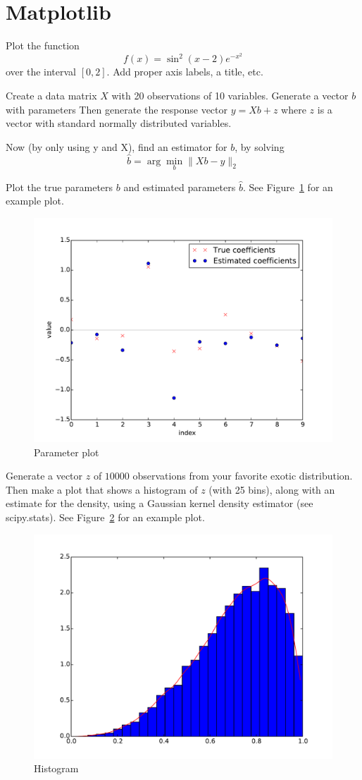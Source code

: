 \section{Matplotlib} %
\label{sec:matplotlib}
\begin{questions}
\label{sub:plotting_a_function}

Plot the function
\[
    f(x) = \sin^2(x-2)e^{-x^2}
\]
over the interval $[0,2]$.
Add proper axis labels, a title, etc.


\label{sub:data}

Create a data matrix $X$ with 20 observations of 10 variables.
Generate a vector $b$ with parameters
Then generate the response vector $y = Xb + z$ where $z$ is a vector with
standard normally distributed variables.

Now (by only using y and X), find an estimator for $b$, by solving
\[
    \hat b = \arg\min_b \|Xb - y\|_2
\]

Plot the true parameters $b$ and estimated parameters $\hat b$.
See Figure~\ref{fig:param_plot} for an example plot.

\begin{figure}
    \centering
    \includegraphics[width=.45\textwidth]{img/param_plot.pdf}
    \caption{Parameter plot}
    \label{fig:param_plot}
\end{figure}


\label{sub:histogram_and_density_estimation}

Generate a vector $z$ of $10000$ observations from your favorite exotic distribution.
Then make a plot that shows a histogram of $z$ (with 25 bins), along with an estimate for the density,
using a Gaussian kernel density estimator (see scipy.stats).
See Figure~\ref{fig:hist} for an example plot.

\begin{figure}
    \centering
    \includegraphics[width=.45\textwidth]{img/hist_plot.pdf}
    \caption{Histogram}
    \label{fig:hist}
\end{figure}

\end{questions}

